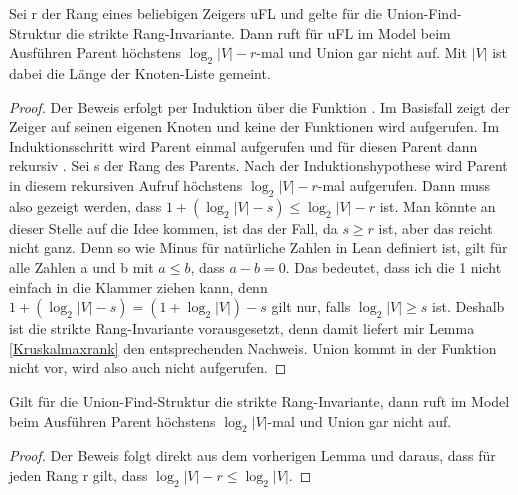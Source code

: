 \begin{lemma}[\KruskalconnectedcomponentofunionFindofunionFindLinkprogtimelog]
  Sei r der Rang eines beliebigen Zeigers uFL und gelte für die Union-Find-Struktur die strikte Rang-Invariante.
  Dann ruft für uFL \KruskalconnectedcomponentofunionFindofunionFindLinkprog im Model \Kruskalfindmodel beim Ausführen Parent höchstens $\log_2|V| - r$-mal und Union gar nicht auf.
  Mit $|V|$ ist dabei die Länge der Knoten-Liste gemeint.
\end{lemma}
\begin{proof}
  Der Beweis erfolgt per Induktion über die Funktion \KruskalconnectedcomponentofunionFindofunionFindLinkprog.
  Im Basisfall zeigt der Zeiger auf seinen eigenen Knoten und keine der Funktionen wird aufgerufen.
  Im Induktionsschritt wird Parent einmal aufgerufen und für diesen Parent dann rekursiv \KruskalconnectedcomponentofunionFindofunionFindLinkprog.
  Sei s der Rang des Parents.
  Nach der Induktionshypothese wird Parent in diesem rekursiven Aufruf höchstens $\log_2|V| - r$-mal aufgerufen.
  Dann muss also gezeigt werden, dass $1 + (\log_2|V| - s) \le \log_2|V| - r$ ist.
  Man könnte an dieser Stelle auf die Idee kommen, ist das der Fall, da $s \ge r$ ist, aber das reicht nicht ganz.
  Denn so wie Minus für natürliche Zahlen in Lean definiert ist, gilt für alle Zahlen a und b mit $a \le b$, dass $a - b = 0$.
  Das bedeutet, dass ich die 1 nicht einfach in die Klammer ziehen kann, denn $1 + (\log_2|V| - s) = (1 + \log_2|V|) - s$ gilt nur, falls $\log_2|V| \ge s$ ist.
  Deshalb ist die strikte Rang-Invariante vorausgesetzt, denn damit liefert mir Lemma \ref{Kruskalmaxrank} den entsprechenden Nachweis.
  Union kommt in der Funktion nicht vor, wird also auch nicht aufgerufen.
\end{proof}

\begin{lemma}[\KruskalconnectedcomponentofunionFindofidprogtimelog]\label{KruskalconnectedcomponentofunionFindofidprogtimelog}
  Gilt für die Union-Find-Struktur die strikte Rang-Invariante,
  dann \KruskalconnectedcomponentofunionFindofidprog ruft im Model \Kruskalfindmodel beim Ausführen Parent höchstens $\log_2|V|$-mal und Union gar nicht auf.
\end{lemma}
\begin{proof}
  Der Beweis folgt direkt aus dem vorherigen Lemma und daraus, dass für jeden Rang r gilt, dass $\log_2|V| - r \le \log_2|V|$.
\end{proof}




